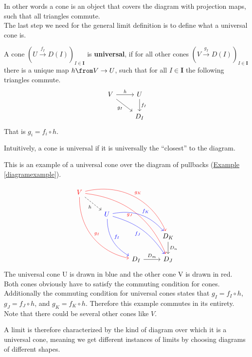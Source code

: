 In other words a cone is an object that covers the diagram with projection maps,
such that all triangles commute.\\
The last step we need for the
general limit definition is
to define what a universal cone is.

\begin{definition}
  A cone $(U \overset{f_I}{\to} D(I))_{I\in \bm{I}}$ is \textbf{universal}, if
  for all other cones $(V \overset{g_I}{\to} D(I))_{I\in \bm{I}}$ there is a unique
  map $h \from V \to U$, such that for all $I \in \bm{I}$
  the following triangles commute.
  \[
    \begin{tikzcd}
      V \arrow[dr, swap, "g_I"] \arrow{r}{h} & U \arrow{d}{f_I} \\
      & D_I
    \end{tikzcd}
  \]
  That is $g_i = f_i \circ h$.
\end{definition}

Intuitively, a cone is universal if it
is universally the ``closest'' to the diagram.

\begin{example}
  This is an example of a universal cone over the
  diagram of pullbacks
  (\hyperref[diagramexample]{Example \ref*{diagramexample}}).
    \[
    \begin{tikzcd}
      {\color{red}V}
      \arrow[bend right=40,color=red]{dddrr}{g_I}
      \arrow[bend left=40, color=red]{ddrrr}{g_K}
      \arrow[bend left=30, color=red, swap]{dddrrr}{g_J}
      \arrow[dashed,swap]{dr}{h}
      & & & \\
      & {\color{blue}U}
      \arrow[bend right=30,color=blue]{ddr}{f_I}
      \arrow[bend left=30, color=blue]{drr}{f_K}
      \arrow[bend left=20, color=blue, swap]{ddrr}{f_J}&   &\\
      & & & D_K \arrow{d}{D_n} \\
      & & D_I \arrow{r}{D_m} & D_J
    \end{tikzcd}
  \]
  The universal cone {\color{blue}U}
  is drawn in blue and the other cone {\color{red}V} is drawn in red.
  Both cones obviously have to satisfy the commuting condition for cones.
  Additionally the commuting condition for universal cones states that
  $g_I = f_I \circ h$, $g_J = f_J \circ h$, and $g_K = f_K \circ h$.
  Therefore this example commutes in its entirety.\\
  Note that there could be several other cones like $V$.
\end{example}

A limit is therefore characterized by the kind of diagram
over which it is a universal cone, meaning we get different instances of limits
by choosing diagrams of different shapes.


